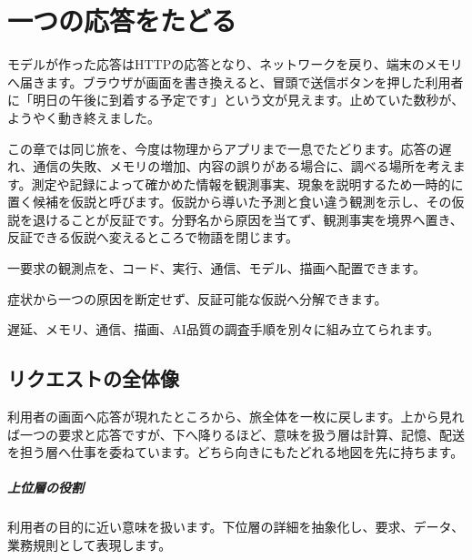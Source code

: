 \chapter{一つの応答をたどる}
\label{chap:practice}

\begin{chapterabstract}
モデルが作った応答はHTTPの応答となり、ネットワークを戻り、端末のメモリへ届きます。ブラウザが画面を書き換えると、冒頭で送信ボタンを押した利用者に「明日の午後に到着する予定です」という文が見えます。止めていた数秒が、ようやく動き終えました。

この章では同じ旅を、今度は物理からアプリまで一息でたどります。応答の遅れ、通信の失敗、メモリの増加、内容の誤りがある場合に、調べる場所を考えます。測定や記録によって確かめた情報を観測事実、現象を説明するため一時的に置く候補を仮説と呼びます。仮説から導いた予測と食い違う観測を示し、その仮説を退けることが反証です。分野名から原因を当てず、観測事実を境界へ置き、反証できる仮説へ変えるところで物語を閉じます。
\end{chapterabstract}

\begin{learninggoals}
  \item 一要求の観測点を、コード、実行、通信、モデル、描画へ配置できます。
  \item 症状から一つの原因を断定せず、反証可能な仮説へ分解できます。
  \item 遅延、メモリ、通信、描画、AI品質の調査手順を別々に組み立てられます。
\end{learninggoals}



\section{リクエストの全体像}
\label{sec:07-practice-01}

利用者の画面へ応答が現れたところから、旅全体を一枚に戻します。上から見れば一つの要求と応答ですが、下へ降りるほど、意味を扱う層は計算、記憶、配送を担う層へ仕事を委ねています。どちら向きにもたどれる地図を先に持ちます。

\begingroup
  \centering
  \vspace{3mm}
\begingroup
\paragraph{上位層の役割}
        利用者の目的に近い意味を扱います。下位層の詳細を抽象化し、要求、データ、業務規則として表現します。

